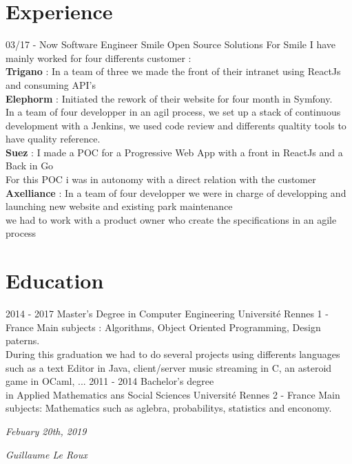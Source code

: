 \documentclass{friggeri-cv}
\begin{document}
\section{Experience}
\begin{entrylist}
	\entry
	{03/17 - Now}
	{Software Engineer}
	{Smile Open Source Solutions}
	{
		For Smile I have mainly worked for four differents customer : \\
		\textbf{Trigano} : In a team of three we made the front of their intranet using ReactJs and consuming API's \\
		\textbf{Elephorm} : Initiated the rework of their website for four month in Symfony. \\
			In a team of four developper in an agil process, we set up a stack of continuous development with a Jenkins, we used code review and differents qualtity tools to have quality reference. \\
		\textbf{Suez} : I made a POC for a Progressive Web App with a front in ReactJs and a Back in Go \\
				For this POC i was in autonomy with a direct relation with the customer \\
		\textbf{Axelliance} : 
			In a team of four developper we were in charge of developping and launching new website and existing park maintenance \\
			we had to work with a product owner who create the specifications in an agile process \\
	}
\end{entrylist}

\section{Education}
\begin{entrylist}
	\entry
	{2014 - 2017}
	{Master's Degree in Computer Engineering}
	{Université Rennes 1 - France}
	{Main subjects : Algorithms, Object Oriented Programming, Design paterns. \\
	During this graduation we had to do several projects using differents languages \\
	such as a text Editor in Java, client/server music streaming in C, an asteroid game in OCaml, ...
	}
	\entry
	{2011 - 2014}
	{Bachelor's degree \\in Applied Mathematics ans Social Sciences }
	{Université Rennes 2 - France}
	{Main subjects: Mathematics such as aglebra, probabilitys, statistics and enconomy.}
\end{entrylist}


\begin{flushleft}
	\emph{Febuary 20th, 2019}
\end{flushleft}
\begin{flushright}
	\emph{Guillaume Le Roux}
\end{flushright}
\end{document}
